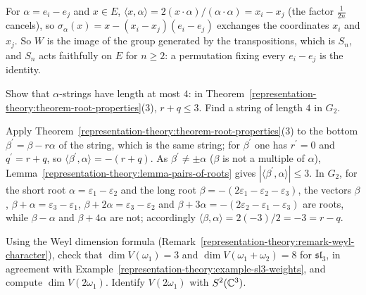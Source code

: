 \begin{solution}
For $\alpha = e_i - e_j$ and $x \in E$, $\langle x, \alpha\rangle = 2(x \cdot \alpha)/(\alpha \cdot \alpha) = x_i - x_j$ (the factor $\frac1{2n}$ cancels), so
$\sigma_\alpha(x) = x - (x_i - x_j)(e_i - e_j)$ exchanges the coordinates $x_i$ and $x_j$. So $W$ is the image of the group generated by the transpositions, which is $S_n$, and $S_n$ acts
faithfully on $E$ for $n \geq 2$: a permutation fixing every $e_i - e_j$ is the identity.
\end{solution}

\begin{exercise}\label{representation-theory:exercise-root-strings}
Show that $\alpha$-strings have length at most $4$: in Theorem~\ref{representation-theory:theorem-root-properties}(3), $r + q \leq 3$. Find a string of length $4$ in $G_2$.
\end{exercise}

\begin{solution}
Apply Theorem~\ref{representation-theory:theorem-root-properties}(3) to the bottom $\beta^{\prime} = \beta - r\alpha$ of the string, which is the same string; for $\beta^{\prime}$ one has
$r^{\prime} = 0$ and $q^{\prime} = r + q$, so $\langle\beta^{\prime}, \alpha\rangle = -(r + q)$. As $\beta^{\prime} \neq \pm\alpha$ ($\beta$ is not a multiple of $\alpha$),
Lemma~\ref{representation-theory:lemma-pairs-of-roots} gives $|\langle\beta^{\prime}, \alpha\rangle| \leq 3$. In $G_2$, for the short root $\alpha = \varepsilon_1 - \varepsilon_2$ and the
long root $\beta = -(2\varepsilon_1 - \varepsilon_2 - \varepsilon_3)$, the vectors $\beta$, $\beta + \alpha = \varepsilon_3 - \varepsilon_1$, $\beta + 2\alpha = \varepsilon_3 - \varepsilon_2$ and
$\beta + 3\alpha = -(2\varepsilon_2 - \varepsilon_1 - \varepsilon_3)$ are roots, while $\beta - \alpha$ and $\beta + 4\alpha$ are not; accordingly
$\langle\beta, \alpha\rangle = 2(-3)/2 = -3 = r - q$.
\end{solution}

\begin{exercise}\label{representation-theory:exercise-sl3-dimension}
Using the Weyl dimension formula (Remark~\ref{representation-theory:remark-weyl-character}), check that $\dim V(\omega_1) = 3$ and $\dim V(\omega_1 + \omega_2) = 8$ for $\mathfrak{sl}_3$, in
agreement with Example~\ref{representation-theory:example-sl3-weights}, and compute $\dim V(2\omega_1)$. Identify $V(2\omega_1)$ with $S^2(\mathbb{C}^3)$.
\end{exercise}

